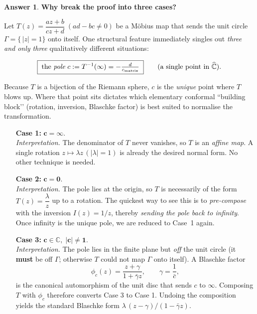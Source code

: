 \documentclass[12pt]{article}
\theoremstyle{definition} %
\newtheorem{answer}{Answer}
\theoremstyle{plain} %
\begin{document}
   \begin{answer}
      \textbf{Why break the proof into three cases?}
      
      Let \(T(z)=\dfrac{az+b}{cz+d}\;(ad-bc\neq0)\) be a Möbius map that
      sends the unit circle \(\Gamma=\{\,|z|=1\}\) onto itself.  
      One structural feature immediately singles out \emph{three and only three}
      qualitatively different situations:
      
      \[
         \boxed{\; \text{the \emph{pole}}
                 \;c:=T^{-1}(\infty)= -\tfrac{d}{c_{\text{matrix}}}\;}
         \qquad(\text{a single point in }\widehat{\mathbb{{C}}}).
      \]
      
      Because \(T\) is a bijection of the Riemann sphere, \(c\) is the
      \emph{unique} point where \(T\) blows up.  Where that point sits
      dictates which elementary conformal “building block’’
      (rotation, inversion, Blaschke factor) is best suited to normalise the
      transformation.
      
      \medskip
      \begin{enumerate}
      \item[\textbf{Case 1:\;}] \(\boldsymbol{c=\infty}\).
            \\
            \textit{Interpretation.}  The denominator of \(T\) never vanishes,
            so \(T\) is an \emph{affine map}.  
            A single rotation \(z\mapsto\lambda z\,(|\lambda|=1)\) is already
            the desired normal form.  No other technique is needed.
      
      \item[\textbf{Case 2:\;}] \(\boldsymbol{c=0}\).
            \\
            \textit{Interpretation.}  The pole lies at the origin, so \(T\) is
            necessarily of the form \(T(z)=\dfrac{\lambda}{z}\) up to a
            rotation.  
            The quickest way to see this is to \emph{pre-compose} with the
            inversion \(I(z)=1/z\), thereby \emph{sending the pole back to
            infinity}.  
            Once infinity is the unique pole, we are reduced to Case~1 again.
      
      \item[\textbf{Case 3:\;}] \(\boldsymbol{c\in\mathbb{{C}},\;|c|\neq1}\).
            \\
            \textit{Interpretation.}  The pole lies in the finite plane
            but \emph{off} the unit circle (it \textbf{must} be off
            \(\Gamma\); otherwise \(T\) could not map \(\Gamma\) onto itself).
            A Blaschke factor
            \[
               \phi_{c}(z)=\frac{z+\gamma}{1+\bar\gamma z},
               \qquad \gamma=\frac1{\bar c},
            \]
            is the canonical automorphism of the unit disc that
            sends \(c\) to \(\infty\).
            Composing \(T\) with \(\phi_{c}\) therefore converts Case 3 to
            Case 1.  Undoing the composition yields the standard Blaschke
            form \(\lambda\,(z-\gamma)/(1-\bar\gamma z)\).
      

\end{enumerate}
\end{answer}
\end{document}
